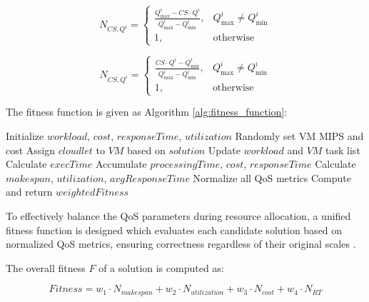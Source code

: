 \documentclass[pdflatex,sn-mathphys-num]{sn-jnl}%
\theoremstyle{thmstyleone}%
\theoremstyle{thmstyletwo}%
\theoremstyle{thmstylethree}%
\begin{document}
\begin{equation} \label{normalise_max}
N_{CS,Q^i} = 
\begin{cases}
\frac{Q^i_{\max} - CS \cdot Q^i}{Q^i_{\max} - Q^i_{\min}}, & Q^i_{\max} \neq Q^i_{\min} \\
1, & \text{otherwise}
\end{cases}
\end{equation} 

\begin{equation} \label{normalise_min}
N_{CS,Q^i} = 
\begin{cases}
\frac{CS \cdot Q^i - Q^i_{\min}}{Q^i_{\max} - Q^i_{\min}}, & Q^i_{\max} \neq Q^i_{\min} \\
1, & \text{otherwise}
\end{cases}
\end{equation}

The fitness function is given as Algorithm \ref{alg:fitness_function}:

\begin{algorithm}
\caption{Fitness Function}\label{alg:fitness_function}
\begin{algorithmic}[1]
    \State Initialize $workload$, $cost$, $responseTime$, $utilization$
    \State Randomly set VM MIPS and cost
        \State Assign $cloudlet$ to $VM$ based on $solution$
        \State Update $workload$ and $VM$ task list
    \EndFor
            \State Calculate $execTime$
            \State Accumulate $processingTime$, $cost$, $responseTime$
        \EndFor
    \EndFor
    \State Calculate $makespan$, $utilization$, $avgResponseTime$
    \State Normalize all QoS metrics
    \State Compute and return $weightedFitness$
\EndProcedure
\end{algorithmic}
\end{algorithm}

To effectively balance the QoS parameters during resource allocation, a unified fitness function is designed which evaluates each candidate solution based on normalized QoS metrics, ensuring correctness regardless of their original scales \cite{bib9}. 

The overall fitness \( F \) of a solution is computed as:

\begin{equation} \label{fitness}
Fitness = w_1 \cdot N_{makespan} + w_2 \cdot N_{utilization} + w_3 \cdot N_{cost} + w_4 \cdot N_{RT}
\end{equation}
\end{document}
